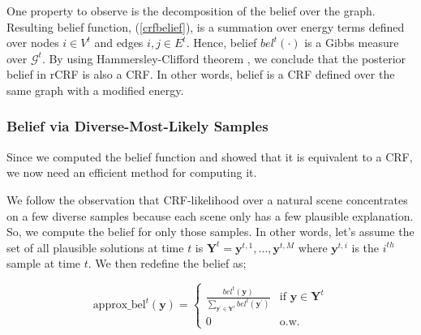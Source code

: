 One property to observe is the decomposition of the belief over the graph. Resulting belief function, (\ref{crfbelief}), is a summation over energy terms defined over nodes $i \in V^t$ and edges $i,j\in E^t$. Hence, belief $bel^t(\cdot)$ is a Gibbs measure over $\mathcal{G}^t$. By using Hammersley-Clifford theorem \cite{hc1971}, we  conclude that the posterior belief in rCRF is also a CRF. In other words, belief is a CRF defined over the same graph with a modified energy.

\subsubsection{Belief via Diverse-Most-Likely Samples}
\label{divm}
Since we computed the belief function and showed that it is equivalent to a CRF, we now need
an efficient method for computing it.


We follow the observation that CRF-likelihood over a natural scene concentrates on a few diverse samples \cite{divmbest} because each scene only has a few plausible explanation. So, we compute the belief for only those samples. In other words, let's assume the set of all plausible solutions at time $t$ is $\mathbf{Y}^t={\mathbf{y}^{t,1},\ldots,\mathbf{y}^{t,M}}$ where $\mathbf{y}^{t,i}$ is the $i^{th}$ sample at time $t$. We then redefine the belief as;

\begin{equation}
	\text{approx\_bel}^t(\mathbf{y})=\left\{ \begin{array}{cc} \frac{bel^t(\mathbf{y})}{\sum_{\mathbf{y}^\prime \in \mathbf{Y}^t} bel^t(\mathbf{y}^\prime)} & \text{if $\mathbf{y} \in \mathbf{Y}^t$} \\ 0 & \text{o.w.} \end{array} \right.
\end{equation}

